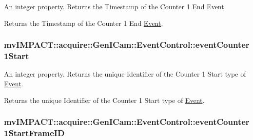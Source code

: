 An integer property. Returns the Timestamp of the Counter 1 End \hyperlink{classmv_i_m_p_a_c_t_1_1acquire_1_1_event}{Event}. 

Returns the Timestamp of the Counter 1 End \hyperlink{classmv_i_m_p_a_c_t_1_1acquire_1_1_event}{Event}. \hypertarget{classmv_i_m_p_a_c_t_1_1acquire_1_1_gen_i_cam_1_1_event_control_a0e32c51eb01207b0bb4f656aa4eaca71}{
\subsubsection[{event\+Counter1\+Start}]{ mv\+I\+M\+P\+A\+C\+T\+::acquire\+::\+Gen\+I\+Cam\+::\+Event\+Control\+::event\+Counter1\+Start}}\label{classmv_i_m_p_a_c_t_1_1acquire_1_1_gen_i_cam_1_1_event_control_a0e32c51eb01207b0bb4f656aa4eaca71}


An integer property. Returns the unique Identifier of the Counter 1 Start type of \hyperlink{classmv_i_m_p_a_c_t_1_1acquire_1_1_event}{Event}. 

Returns the unique Identifier of the Counter 1 Start type of \hyperlink{classmv_i_m_p_a_c_t_1_1acquire_1_1_event}{Event}. \hypertarget{classmv_i_m_p_a_c_t_1_1acquire_1_1_gen_i_cam_1_1_event_control_a4920e5ce3e443f6237739c19c20a6714}{
\subsubsection[{event\+Counter1\+Start\+Frame\+I\+D}]{ mv\+I\+M\+P\+A\+C\+T\+::acquire\+::\+Gen\+I\+Cam\+::\+Event\+Control\+::event\+Counter1\+Start\+Frame\+I\+D}}\label{classmv_i_m_p_a_c_t_1_1acquire_1_1_gen_i_cam_1_1_event_control_a4920e5ce3e443f6237739c19c20a6714}


